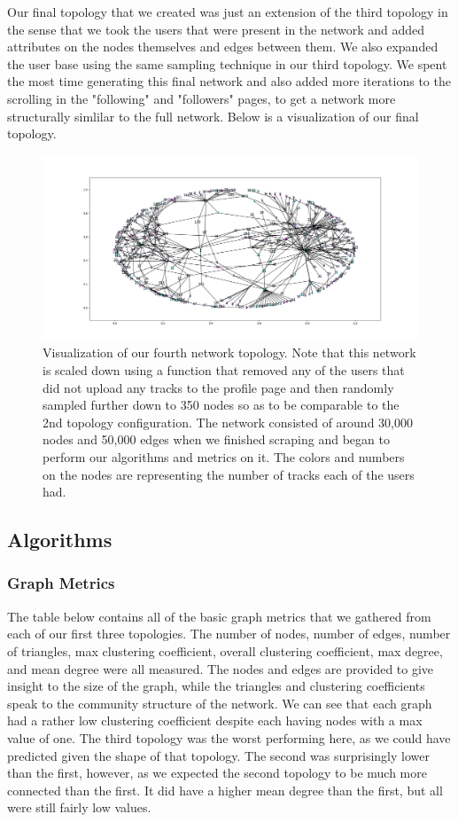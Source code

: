 \documentclass{article}
\begin{document}
Our final topology that we created was just an extension of the third topology in the sense that we took the users that were present in the network and added attributes on the nodes themselves and edges between them.  We also expanded the user base using the same sampling technique in our third topology.  We spent the most time generating this final network and also added more iterations to the scrolling in the "following" and "followers" pages, to get a network more structurally simlilar to the full network.  Below is a visualization of our final topology.

\begin{figure}[h]
	\centering
	\includegraphics[scale=0.29]{take_4_visualization}
	\caption{Visualization of our fourth network topology.  Note that this network is scaled down using a function that removed any of the users that did not upload any tracks to the profile page and then randomly sampled further down to 350 nodes so as to be comparable to the 2nd topology configuration.  The network consisted of around 30,000 nodes and 50,000 edges when we finished scraping and began to perform our algorithms and metrics on it.  The colors and numbers on the nodes are representing the number of tracks each of the users had.}
\end{figure}

\subsection{Algorithms}

\subsubsection{Graph Metrics}
The table below contains all of the basic graph metrics that we gathered from each of our first three topologies. The number of nodes, number of edges, number of triangles, max clustering coefficient, overall clustering coefficient, max degree, and mean degree were all measured. The nodes and edges are provided to give insight to the size of the graph, while the triangles and clustering coefficients speak to the community structure of the network. We can see that each graph had a rather low clustering coefficient despite each having nodes with a max value of one. The third topology was the worst performing here, as we could have predicted given the shape of that topology. The second was surprisingly lower than the first, however, as we expected the second topology to be much more connected than the first. It did have a higher mean degree than the first, but all were still fairly low values. 
\end{document}
